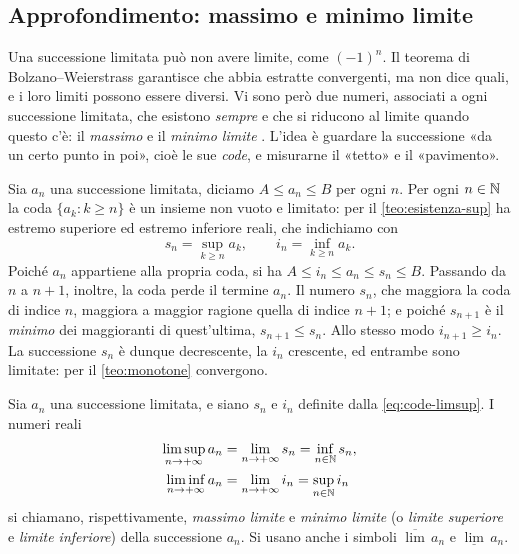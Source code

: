 \subsection{Approfondimento: massimo e minimo limite}
\label{subsec:massimo-minimo-limite}

Una successione limitata può non avere limite, come $(-1)^{n}$. Il teorema di
Bolzano--Weierstrass garantisce che abbia estratte convergenti, ma non dice quali, e i
loro limiti possono essere diversi. Vi sono però due numeri, associati a ogni
successione limitata, che esistono \emph{sempre} e che si riducono al limite quando
questo c'è: il \emph{massimo} e il \emph{minimo limite} \cite{giusti}. L'idea è guardare
la successione «da un certo punto in poi», cioè le sue \emph{code}, e misurarne il
«tetto» e il «pavimento».

Sia $a_{n}$ una successione limitata, diciamo $A\le a_{n}\le B$ per ogni $n$. Per ogni
$n\in\mathbb{N}$ la coda $\{a_{k} : k\ge n\}$ è un insieme non vuoto e limitato: per il
\cref{teo:esistenza-sup} ha estremo superiore ed estremo inferiore reali, che indichiamo
con
\begin{equation}\label{eq:code-limsup}
  s_{n}=\sup_{k\ge n}a_{k}, \qquad i_{n}=\inf_{k\ge n}a_{k} .
\end{equation}
Poiché $a_{n}$ appartiene alla propria coda, si ha $A\le i_{n}\le a_{n}\le s_{n}\le B$.
Passando da $n$ a $n+1$, inoltre, la coda perde il termine $a_{n}$. Il numero $s_{n}$,
che maggiora la coda di indice $n$, maggiora a maggior ragione quella di indice $n+1$;
e poiché $s_{n+1}$ è il \emph{minimo} dei maggioranti di quest'ultima, $s_{n+1}\le s_{n}$.
Allo stesso modo $i_{n+1}\ge i_{n}$. La successione $s_{n}$ è dunque decrescente, la
$i_{n}$ crescente, ed entrambe sono limitate: per il \cref{teo:monotone} convergono.

\begin{definizione}\label{def:limsup}
Sia $a_{n}$ una successione limitata, e siano $s_{n}$ e $i_{n}$ definite dalla
\eqref{eq:code-limsup}. I numeri reali
\begin{equation}\label{eq:limsup-def}
\begin{aligned}
  \limsup_{n\to+\infty}a_{n}&=\lim_{n\to+\infty}s_{n}=\inf_{n\in\mathbb{N}}s_{n},\\
  \liminf_{n\to+\infty}a_{n}&=\lim_{n\to+\infty}i_{n}=\sup_{n\in\mathbb{N}}i_{n}
\end{aligned}
\end{equation}
si chiamano, rispettivamente, \emph{massimo limite} e \emph{minimo limite} (o
\emph{limite superiore} e \emph{limite inferiore}) della successione $a_{n}$. Si usano
anche i simboli $\overline{\lim}\,a_{n}$ e $\underline{\lim}\,a_{n}$.
\end{definizione}


